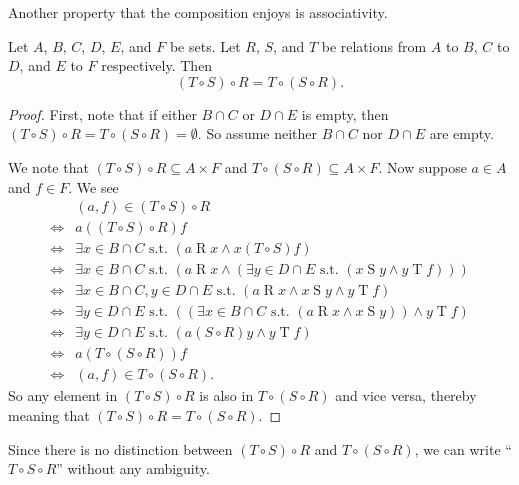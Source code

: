 Another property that the composition enjoys is associativity.

\begin{theorem}\label{theorem:associativity-of-composition-relations}
    Let $A$, $B$, $C$, $D$, $E$, and $F$ be sets. Let $R$, $S$, and $T$ be relations from $A$ to $B$, $C$ to $D$, and $E$ to $F$ respectively. Then
    \[
        (T \circ S) \circ R = T \circ (S \circ R).
    \]
\end{theorem}
\begin{proof}
    First, note that if either $B \cap C$ or $D \cap E$ is empty, then $(T \circ S) \circ R = T \circ (S \circ R) = \emptyset$. So assume neither $B \cap C$ nor $D \cap E$ are empty.

    We note that $(T \circ S) \circ R \subseteq A \times F$ and $T \circ (S \circ R) \subseteq A \times F$. Now suppose $a \in A$ and $f \in F$. We see
    \begin{align*}
        &(a, f) \in (T \circ S) \circ R\\
        \iff& a \mathrel{((T \circ S) \circ R)} f\\
        \iff& \exists x \in B \cap C \text{ s.t. } (a \mathrel{R} x \land x \mathrel{(T\circ S)} f)\\
        \iff& \exists x \in B \cap C \text{ s.t. } (a \mathrel{R} x \land (\exists y \in D \cap E \text{ s.t. } (x \mathrel{S} y \land y \mathrel{T} f)))\\
        \iff& \exists x \in B \cap C, y \in D \cap E \text{ s.t. } (a \mathrel{R} x \land x \mathrel{S} y \land y \mathrel{T} f)\\
        \iff& \exists y \in D \cap E \text{ s.t. } ((\exists x \in B \cap C \text{ s.t. } (a \mathrel{R} x \land x \mathrel{S} y)) \land y \mathrel{T} f)\\
        \iff& \exists y \in D \cap E \text{ s.t. } (a \mathrel{(S \circ R)} y \land y \mathrel{T} f)\\
        \iff& a \mathrel{(T \circ (S \circ R))} f\\
        \iff& (a, f) \in T \circ (S \circ R).
    \end{align*}
    So any element in $(T \circ S) \circ R$ is also in $T \circ (S \circ R)$ and vice versa, thereby meaning that $(T \circ S) \circ R = T \circ (S \circ R)$.
\end{proof}

Since there is no distinction between $(T \circ S) \circ R$ and $T \circ (S \circ R)$, we can write ``$T \circ S \circ R$'' without any ambiguity.

